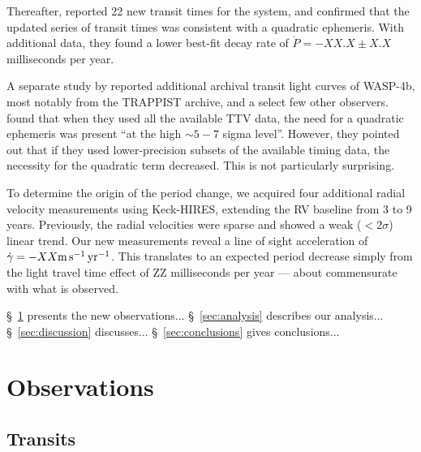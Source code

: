 \documentclass[12pt,twocolumn,tighten]{aastex62}
\begin{document}
Thereafter, \citet{southworth_transit_2019} reported 22 new transit
times for the system, and confirmed that the updated series of transit
times was consistent with a quadratic ephemeris.  With additional
data, they found a lower best-fit decay rate of $\dot{P} = -XX.X \pm
X.X$ milliseconds per year.

A separate study by \citet{baluev_2019} reported
additional archival transit light curves of WASP-4b, most notably from
the TRAPPIST archive, and a select few other observers.
\citeauthor{baluev_2019} found that when they used all
the available TTV data, the need for a quadratic ephemeris was present
``at the high $\sim 5-7$ sigma level''.  However, they pointed out
that if they used lower-precision subsets of the available timing
data, the necessity for the quadratic term decreased. This is not
particularly surprising.

To determine the origin of the period change, we acquired four
additional radial velocity measurements using Keck-HIRES, extending
the RV baseline from 3 to 9 years.  Previously, the radial velocities
were sparse and showed a weak ($<2\sigma$) linear trend.  Our new
measurements reveal a line of sight acceleration of $\dot{\gamma} =
-XX {\rm m\,s^{-1}\,yr^{-1}}$.  This translates to an expected period
decrease simply from the light travel time effect of ZZ milliseconds
per year --- about commensurate with what is observed.

\S~\ref{sec:observations} presents the new observations...
\S~\ref{sec:analysis} describes our analysis...
\S~\ref{sec:discussion} discusses...
\S~\ref{sec:conclusions} gives conclusions...

\section{Observations}
\label{sec:observations}

\subsection{Transits}
\end{document}
